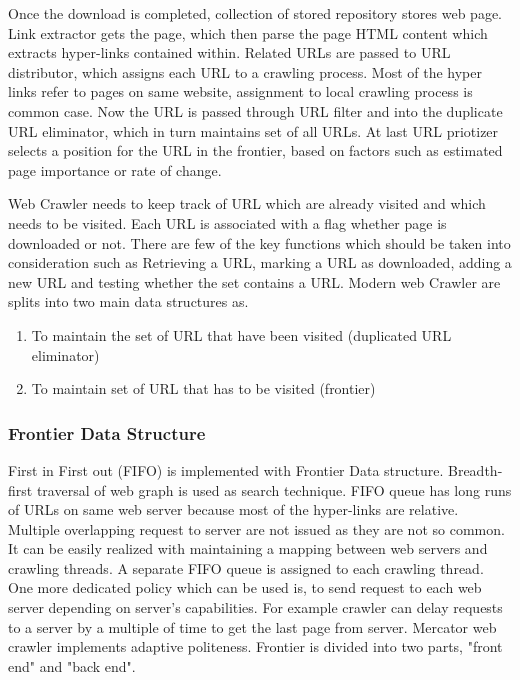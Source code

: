 \documentclass[article,type=msc,colorback,accentcolor=tud9c,twoside,11pt]{tudthesis}
\begin{document}
	Once the download is completed, collection of stored repository stores web page. Link extractor gets the page, which then parse the page HTML content which extracts hyper-links contained within. Related URLs are passed to URL distributor, which assigns each URL to a crawling process. Most of the hyper links refer to pages on same website, assignment to local crawling process is common case. Now the URL is passed through URL filter and into the duplicate URL eliminator, which in turn maintains set of all URLs.  At last URL priotizer selects a position for the URL in the frontier, based on factors such as estimated page importance or rate of change.
	
	Web Crawler needs to keep track of URL which are already visited and which needs to be visited. Each URL is associated with a flag whether page is downloaded or not. There are few of the key functions which should be taken into consideration such as Retrieving a URL, marking a URL as downloaded, adding a new URL and testing whether the set contains a URL. Modern web Crawler are splits into two main data structures as. 
	\begin{enumerate}
		\item To maintain the set of URL that have been visited (duplicated URL eliminator)
		\item To maintain set of URL that has to be visited (frontier)
	\end{enumerate}
	
	\subsubsection{Frontier Data Structure}
	First in First out (FIFO) is implemented with  Frontier Data structure. Breadth-first traversal of web graph is used as search technique. FIFO queue has long runs of URLs on same web server because most of the  hyper-links are relative. Multiple overlapping request to server are not issued as they are not so common. It can be easily realized with maintaining a mapping between web servers and crawling threads. A separate FIFO queue is assigned to each crawling thread. One more dedicated policy which can be used is, to send request to each web server depending on server's capabilities. For example crawler can delay requests to a server by a multiple of time to get the last page from server. Mercator web crawler implements adaptive politeness. Frontier is divided into two parts, "front end" and "back end".
	
\end{document}
